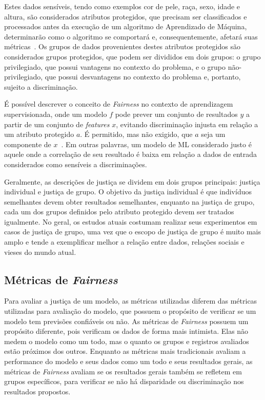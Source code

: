 \documentclass[Portugues,Final]{ic-tese-v3}
\begin{document}
Estes dados sensíveis, tendo como exemplos cor de pele, raça, sexo, idade e altura, são considerados atributos protegidos, que precisam ser classificados e processados antes da execução de um algoritmo de Aprendizado de Máquina, determinarão como o algoritmo se comportará e, consequentemente, afetará suas métricas~\cite{Mougan_2022}. Os grupos de dados provenientes destes atributos protegidos são considerados grupos protegidos, que podem ser divididos em dois grupos: o grupo privilegiado, que possui vantagens no contexto do problema, e o grupo não-privilegiado, que possui desvantagens no contexto do problema e, portanto, sujeito a discriminação.

É possível descrever o conceito de \textit{Fairness} no contexto de aprendizagem supervisionada, onde um modelo $f$ pode prever um conjunto de resultados $y$ a partir de um conjunto de \textit{features} $x$, evitando discriminação injusta em relação a um atributo protegido $a$. É permitido, mas não exigido, que $a$ seja um componente de $x$~\cite{Begley_2021}. Em outras palavras, um modelo de ML considerado justo é aquele onde a correlação de seu resultado é baixa em relação a dados de entrada considerados como sensíveis a discriminações.

Geralmente, as descrições de justiça se dividem em dois grupos principais: justiça individual e justiça de grupo. O objetivo da justiça individual é que indivíduos semelhantes devem obter resultados semelhantes, enquanto na justiça de grupo, cada um dos grupos definidos pelo atributo protegido devem ser tratados igualmente. No geral, os estudos atuais costumam realizar seus experimentos em casos de justiça de grupo, uma vez que o escopo de justiça de grupo é muito mais amplo e tende a exemplificar melhor a relação entre dados, relações sociais e vieses do mundo atual.

\subsection{Métricas de \textit{Fairness}}
\label{sec:FairnessMetrics}

Para avaliar a justiça de um modelo, as métricas utilizadas diferem das métricas utilizadas para avaliação do modelo, que possuem o propósito de verificar se um modelo tem previsões confiáveis ou não. As métricas de \textit{Fairness} possuem um propósito diferente, pois verificam os dados de forma mais intimista. Elas não medem o modelo como um todo, mas o quanto os grupos e registros avaliados estão próximos dos outros. Enquanto as métricas mais tradicionais avaliam a performance do modelo e seus dados como um todo e seus resultados gerais, as métricas de \textit{Fairness} avaliam se os resultados gerais também se refletem em grupos específicos, para verificar se não há disparidade ou discriminação nos resultados propostos.
\end{document}

